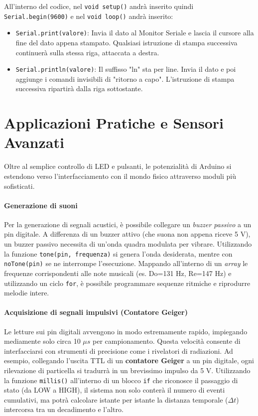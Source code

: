 \documentclass[12pt, letterpaper]{book}
\begin{document}
    All'interno del codice, nel \lstinline[style=myArduino]{void setup()} andrà inserito quindi \lstinline[style=myArduino]{Serial.begin(9600)} e nel \lstinline[style=myArduino]{void loop()} andrà inserito:

    \begin{itemize}[leftmargin=1.2cm, itemsep=1pt, topsep=5pt]
      \item \lstinline[style=myArduino]{Serial.print(valore)}: Invia il dato al Monitor Seriale e lascia il cursore alla fine del dato appena stampato. Qualsiasi istruzione di stampa successiva continuerà sulla stessa riga, attaccata a destra.
      \item \lstinline[style=myArduino]{Serial.println(valore)}: Il suffisso "ln" sta per line. Invia il dato e poi aggiunge i comandi invisibili di "ritorno a capo". L'istruzione di stampa successiva ripartirà dalla riga sottostante.
    \end{itemize}

  \section{Applicazioni Pratiche e Sensori Avanzati}
  
  Oltre al semplice controllo di LED e pulsanti, le potenzialità di Arduino si estendono verso l'interfacciamento con il mondo fisico attraverso moduli più sofisticati.

  \paragraph{Generazione di suoni}
  Per la generazione di segnali acustici, è possibile collegare un \textit{buzzer passivo} a un pin digitale. A differenza di un buzzer attivo (che suona non appena riceve 5 V), un buzzer passivo necessita di un'onda quadra modulata per vibrare. Utilizzando la funzione \lstinline[style=myArduino]{tone(pin, frequenza)} si genera l'onda desiderata, mentre con \lstinline[style=myArduino]{noTone(pin)} se ne interrompe l'esecuzione. Mappando all'interno di un \textit{array} le frequenze corrispondenti alle note musicali (es. Do=131 Hz, Re=147 Hz) e utilizzando un ciclo \texttt{for}, è possibile programmare sequenze ritmiche e riprodurre melodie intere.

  \paragraph{Acquisizione di segnali impulsivi (Contatore Geiger)}
  Le letture sui pin digitali avvengono in modo estremamente rapido, impiegando mediamente solo circa 10 $\mu s$ per campionamento. Questa velocità consente di interfacciarsi con strumenti di precisione come i rivelatori di radiazioni. Ad esempio, collegando l'uscita TTL di un \textbf{contatore Geiger} a un pin digitale, ogni rilevazione di particella si tradurrà in un brevissimo impulso da 5 V. Utilizzando la funzione \lstinline[style=myArduino]{millis()} all'interno di un blocco \lstinline[style=myArduino]{if} che riconosce il passaggio di stato (da LOW a HIGH), il sistema non solo conterà il numero di eventi cumulativi, ma potrà calcolare istante per istante la distanza temporale ($\Delta t$) intercorsa tra un decadimento e l'altro.
\end{document}
